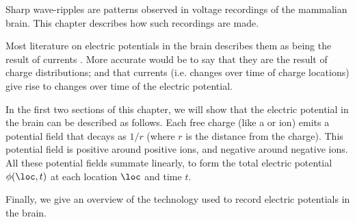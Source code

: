 Sharp wave-ripples are patterns observed in voltage recordings of the mammalian brain. This chapter describes how such recordings are made.

Most literature on electric potentials in the brain describes them as being the result of currents \cite{Nunez2006, Buzsaki2012a, Leung2011, Linden2014}. More accurate would be to say that they are the result of charge distributions; and that currents (i.e. changes over time of charge locations) give rise to changes over time of the electric potential.

In the first two sections of this chapter, we will show that the electric potential in the brain can be described as follows. Each free charge (like a  or  ion) emits a potential field that decays as $1/r$ (where $r$ is the distance from the charge). This potential field is positive around positive ions, and negative around negative ions. All these potential fields summate linearly, to form the total electric potential $\phi(\loc,t)$ at each location $\loc$ and time $t$.



Finally, we give an overview of the technology used to record electric potentials in the brain.



%
